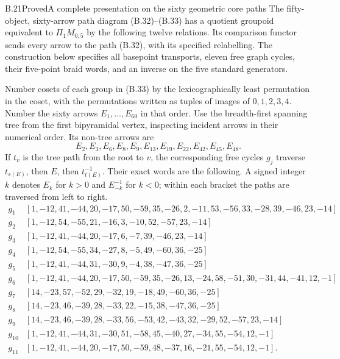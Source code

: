 \begin{result}{B.21}{Proved}{A complete presentation on the sixty geometric core paths}
The fifty-object, sixty-arrow path diagram (B.32)--(B.33)
has a quotient groupoid equivalent to $\Pi_1M_{0,5}$ by the
following twelve relations.  Its comparison functor sends
every arrow to the path (B.32), with its specified relabelling.
The construction below specifies all basepoint transports,
eleven free graph cycles, their five-point braid words, and
an inverse on the five standard generators.

Number cosets of each group in (B.33) by the lexicographically
least permutation in the coset, with the permutations written
as tuples of images of $0,1,2,3,4$.  Number the sixty arrows
$E_1,\ldots,E_{60}$ in that order.  Use the breadth-first
spanning tree from the first bipyramidal vertex, inspecting
incident arrows in their numerical order.  Its non-tree
arrows are
\[
 E_2,E_3,E_6,E_8,E_9,E_{13},E_{19},E_{22},E_{42},E_{45},E_{48}.
                                                               \tag{B.35}
\]
If $t_v$ is the tree path from the root to $v$, the corresponding
free cycles $g_j$ traverse $t_{s(E)}$, then $E$, then
$t_{t(E)}^{-1}$.  Their exact words are the following.  A signed
integer $k$ denotes $E_k$ for $k>0$ and $E_{-k}^{-1}$ for $k<0$;
within each bracket the paths are traversed from left to right.
\begingroup\small
\[
\begin{array}{c|l}
g_1 &[1,-12,41,-44,20,-17,50,-59,35,-26,2,-11,53,-56,33,-28,39,-46,23,-14]\\
g_2 &[1,-12,54,-55,21,-16,3,-10,52,-57,23,-14]\\
g_3 &[1,-12,41,-44,20,-17,6,-7,39,-46,23,-14]\\
g_4 &[1,-12,54,-55,34,-27,8,-5,49,-60,36,-25]\\
g_5 &[1,-12,41,-44,31,-30,9,-4,38,-47,36,-25]\\
g_6 &[1,-12,41,-44,20,-17,50,-59,35,-26,13,-24,58,-51,30,-31,44,-41,12,-1]\\
g_7 &[14,-23,57,-52,29,-32,19,-18,49,-60,36,-25]\\
g_8 &[14,-23,46,-39,28,-33,22,-15,38,-47,36,-25]\\
g_9 &[14,-23,46,-39,28,-33,56,-53,42,-43,32,-29,52,-57,23,-14]\\
g_{10}&[1,-12,41,-44,31,-30,51,-58,45,-40,27,-34,55,-54,12,-1]\\
g_{11}&[1,-12,41,-44,20,-17,50,-59,48,-37,16,-21,55,-54,12,-1].
\end{array}                                                    \tag{B.36}
\]
\end{result}
